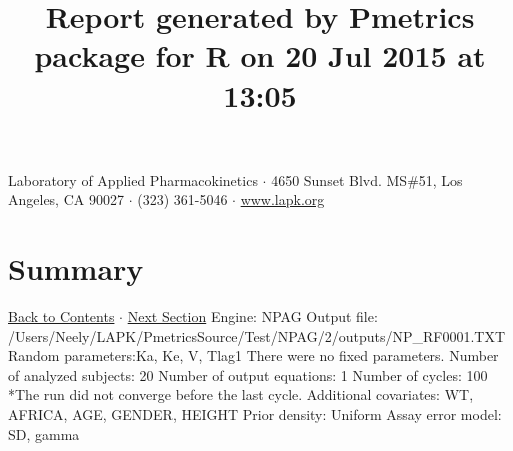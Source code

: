\documentclass{article}
\title{Report generated by Pmetrics package for R on 20 Jul 2015 at 13:05 }
\date{}
\begin{document}
              \maketitle 
Laboratory of Applied Pharmacokinetics $\cdot$ 4650 Sunset Blvd. MS\#51, Los Angeles, CA 90027 $\cdot$ (323) 361-5046 $\cdot$ \href{http://www.lapk.org}{www.lapk.org} 
\hypertarget{tableofcontents}{}
        \tableofcontents
        \newpage 
\section{Summary} \hyperlink{tableofcontents}{Back to Contents} $\cdot$ \hyperlink{cycleinfo}{Next Section}\newline
 \newline 
Engine: NPAG\newline 
Output file: /Users/Neely/LAPK/PmetricsSource/Test/NPAG/2/outputs/NP\_RF0001.TXT\newline 
Random parameters:Ka, Ke, V, Tlag1\newline 
There were no fixed parameters. \newline 
Number of analyzed subjects:  20 \newline 
Number of output equations:  1 \newline 
Number of cycles:  100     *The run did not converge before the last cycle. \newline 
Additional covariates:  WT, AFRICA, AGE, GENDER, HEIGHT \newline 
Prior density: Uniform \newline Assay error model: SD, gamma \newline  \newline 
\newpage
            \hypertarget{cycleinfo}{}
            
\end{document}
